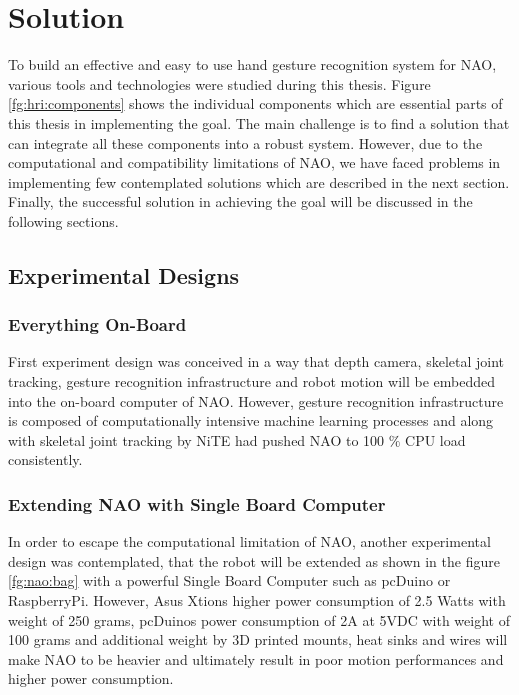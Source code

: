 \chapter{Solution} To build an effective and easy to use hand gesture recognition system for NAO, various tools and technologies were studied during this thesis. Figure \ref{fg:hri:components} shows the individual components which are essential parts of this thesis in implementing the goal. The main challenge is to find a solution that can integrate all these components into a robust system. However, due to the computational and compatibility limitations of NAO, we have faced problems in implementing few contemplated solutions which are described in the next section. Finally, the successful solution in achieving the goal will be discussed in the following sections.



\section{Experimental Designs} 
\subsection{Everything On-Board} First experiment design was conceived in a way that depth camera, skeletal joint tracking, gesture recognition infrastructure and robot motion will be embedded into the on-board computer of NAO. However, gesture recognition infrastructure is composed of computationally intensive machine learning processes and along with skeletal joint tracking by NiTE had pushed NAO to 100 $ \% $ CPU load consistently.

\subsection{Extending NAO with Single Board Computer} In order to escape the computational limitation of NAO, another experimental design was contemplated, that the robot will be extended as shown in the figure \ref{fg:nao:bag} with a powerful Single Board Computer such as pcDuino or RaspberryPi. However, Asus Xtions higher power consumption of 2.5 Watts with weight of 250 grams, pcDuinos power consumption of 2A at 5VDC with weight of 100 grams and additional weight by 3D printed mounts, heat sinks and wires will make NAO to be heavier and ultimately result in poor motion performances and higher power consumption. 

